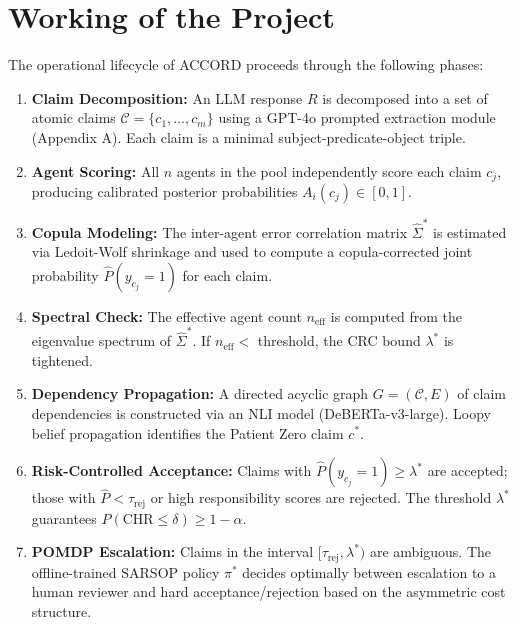 \documentclass[12pt,a4paper]{report}
\begin{document}
\section{Working of the Project}

The operational lifecycle of ACCORD proceeds through the following phases:

\begin{enumerate}
    \item \textbf{Claim Decomposition:} An LLM response $R$ is decomposed into a set of atomic claims $\mathcal{C} = \{c_1, \ldots, c_m\}$ using a GPT-4o prompted extraction module (Appendix A). Each claim is a minimal subject-predicate-object triple.

    \item \textbf{Agent Scoring:} All $n$ agents in the pool independently score each claim $c_j$, producing calibrated posterior probabilities $A_i(c_j) \in [0, 1]$.

    \item \textbf{Copula Modeling:} The inter-agent error correlation matrix $\hat{\Sigma}^*$ is estimated via Ledoit-Wolf shrinkage and used to compute a copula-corrected joint probability $\hat{P}(y_{c_j} = 1)$ for each claim.

    \item \textbf{Spectral Check:} The effective agent count $n_{\text{eff}}$ is computed from the eigenvalue spectrum of $\hat{\Sigma}^*$. If $n_{\text{eff}} < $ threshold, the CRC bound $\lambda^*$ is tightened.

    \item \textbf{Dependency Propagation:} A directed acyclic graph $G = (\mathcal{C}, E)$ of claim dependencies is constructed via an NLI model (DeBERTa-v3-large). Loopy belief propagation identifies the Patient Zero claim $c^*$.

    \item \textbf{Risk-Controlled Acceptance:} Claims with $\hat{P}(y_{c_j}=1) \geq \lambda^*$ are accepted; those with $\hat{P} < \tau_{\text{rej}}$ or high responsibility scores are rejected. The threshold $\lambda^*$ guarantees $P(\text{CHR} \leq \delta) \geq 1 - \alpha$.

    \item \textbf{POMDP Escalation:} Claims in the interval $[\tau_{\text{rej}}, \lambda^*)$ are ambiguous. The offline-trained SARSOP policy $\pi^*$ decides optimally between escalation to a human reviewer and hard acceptance/rejection based on the asymmetric cost structure.
\end{enumerate}
\end{document}

